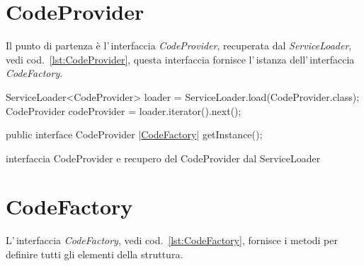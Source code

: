 \documentclass[a4paper,10pt]{report}
\newenvironment{elisting}[1][H]
  {\captionsetup{aboveskip=0pt}\begin{listing}[#1]}
  {\end{listing}%
}
\begin{document}
\section{CodeProvider}
Il punto di partenza è l'\,interfaccia \textsl{CodeProvider}, recuperata dal
\textsl{ServiceLoader}, vedi cod.~\ref{lst:CodeProvider}, 
questa interfaccia fornisce l'\,istanza 
dell'\,in\-ter\-fac\-cia \textsl{CodeFactory}.

\begin{elisting}[!htb]
\begin{javacode}
      ServiceLoader<CodeProvider> loader = ServiceLoader.load(CodeProvider.class);
      CodeProvider codeProvider = loader.iterator().next();
\end{javacode}
\vspace*{-1cm}
\begin{javacode}
public interface CodeProvider {
     |\hyperref[lst:CodeFactory]{CodeFactory}| getInstance();
}
\end{javacode}
\caption{interfaccia CodeProvider e recupero del CodeProvider dal ServiceLoader}
\label{lst:CodeProvider}
\end{elisting}


\section{CodeFactory}
L'\,interfaccia \textsl{CodeFactory}, vedi cod.~\ref{lst:CodeFactory}, fornisce 
i metodi per definire tutti gli elementi della struttura.
\end{document}
